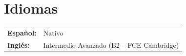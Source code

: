\documentclass[a4paper,10pt]{article}
\begin{document}
\section{Idiomas}

\begin{tabular}{@{}l l}
  \textbf{Espa\~nol:} & Nativo \\[3pt]
  \textbf{Ingl\'es:} & Intermedio-Avanzado (B2 -- FCE Cambridge) \\
\end{tabular}
\end{document}
